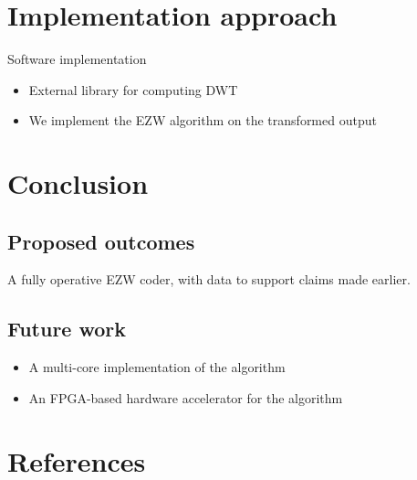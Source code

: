 \documentclass{beamer}
\begin{document}
\section{Implementation approach}
\begin{frame}{Software implementation}
    \begin{itemize}
        \item External library for computing DWT \cite{wavelib}
        \item We implement the EZW algorithm on the transformed output
    \end{itemize}
\end{frame}

\section{Conclusion}
\subsection{Proposed outcomes}
\begin{frame}
    A fully operative EZW coder, with data to support claims made earlier.
\end{frame}

\subsection{Future work}
\begin{frame}
    \begin{itemize}
        \item A multi-core implementation of the algorithm
        \item An FPGA-based hardware accelerator for the algorithm
    \end{itemize}
\end{frame}

\section{References}
\printbibliography
\end{document}
